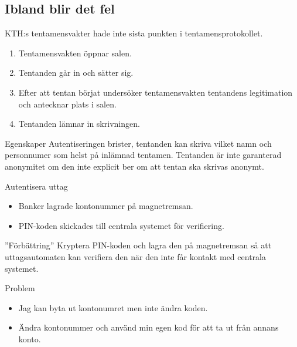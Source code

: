 \documentclass{beamer}
\theoremstyle{definition}
\theoremstyle{remark}
\begin{document}
\subsection{Ibland blir det fel}

\begin{frame}
  \begin{example}
    KTH:s tentamensvakter hade inte sista punkten i tentamensprotokollet.
    \begin{enumerate}
      \item Tentamensvakten öppnar salen.
      \item Tentanden går in och sätter sig.
      \item Efter att tentan börjat undersöker tentamensvakten tentandens 
        legitimation och antecknar plats i salen.
      \item Tentanden lämnar in skrivningen.
    \end{enumerate}
  \end{example}
  \begin{block}{Egenskaper}
    Autentiseringen brister, tentanden kan skriva vilket namn och personnumer 
    som helst på inlämnad tentamen.
    Tentanden är inte garanterad anonymitet om den inte explicit ber om att 
    tentan ska skrivas anonymt.
  \end{block}
\end{frame}

\begin{frame}
  \begin{block}{Autentisera uttag}
    \begin{itemize}
      \item Banker lagrade kontonummer på magnetremsan.
      \item PIN-koden skickades till centrala systemet för verifiering.
    \end{itemize}
  \end{block}
  \begin{block}{''Förbättring''}
    Kryptera PIN-koden och lagra den på magnetremsan så att uttagsautomaten kan 
    verifiera den när den inte får kontakt med centrala systemet.
  \end{block}
\end{frame}

\begin{frame}
  \begin{block}{Problem}
    \begin{itemize}
      \item Jag kan byta ut kontonumret men inte ändra koden.
      \item Ändra kontonummer och använd min egen kod för att ta ut från annans 
        konto.
    \end{itemize}
  \end{block}
\end{frame}
\end{document}

